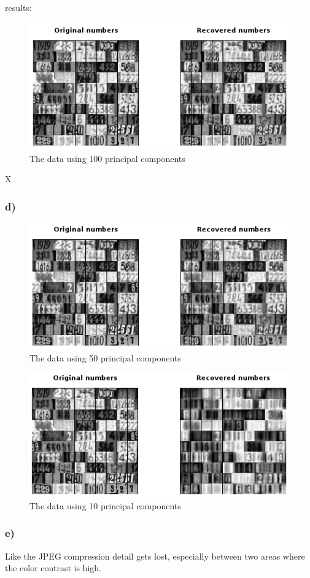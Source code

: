 results:

\begin{figure}[!ht]
\includegraphics[width=1\textwidth]{chapters/images/figure-3-7-c}
\caption{The data using 100 principal components}
\end{figure}
X



\subsubsection{d)}

\begin{figure}[!ht]
\includegraphics[width=1\textwidth]{chapters/images/figure-3-7-d1}
\caption{The data using 50 principal components}
\end{figure}

\begin{figure}[!ht]
\includegraphics[width=1\textwidth]{chapters/images/figure-3-7-d2}
\caption{The data using 10 principal components}
\end{figure}


\subsubsection{e)}

Like the JPEG compression detail gets lost, especially between two areas where the color contrast is high.

